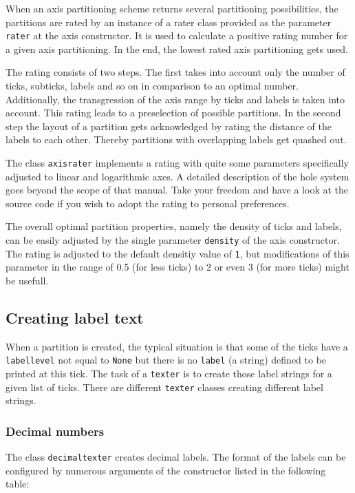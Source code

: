 When an axis partitioning scheme returns several partitioning
possibilities, the partitions are rated by an instance of a rater
class provided as the parameter \verb|rater| at the axis constructor.
It is used to calculate a positive rating number for a given axis
partitioning. In the end, the lowest rated axis partitioning gets
used.

The rating consists of two steps. The first takes into account only
the number of ticks, subticks, labels and so on in comparison to an
optimal number. Additionally, the transgression of the axis range by
ticks and labels is taken into account. This rating leads to a
preselection of possible partitions. In the second step the layout of
a partition gets acknowledged by rating the distance of the labels to
each other. Thereby partitions with overlapping labels get quashed
out.

The class \verb|axisrater| implements a rating with quite some
parameters specifically adjusted to linear and logarithmic axes. A
detailed description of the hole system goes beyond the scope of that
manual. Take your freedom and have a look at the \PyX{} source code if
you wish to adopt the rating to personal preferences.

The overall optimal partition properties, namely the density of ticks
and labels, can be easily adjusted by the single parameter
\verb|density| of the axis constructor. The rating is
adjusted to the default densitiy value of \verb|1|, but modifications
of this parameter in the range of 0.5 (for less ticks) to 2 or even 3
(for more ticks) might be usefull.

\subsection{Creating label text}

When a partition is created, the typical situation is that some of the
ticks have a \verb|labellevel| not equal to \verb|None| but there is
no \verb|label| (a string) defined to be printed at this tick. The
task of a \verb|texter| is to create those label strings for a given
list of ticks. There are different \verb|texter| classes creating
different label strings.

\subsubsection{Decimal numbers}

The class \verb|decimaltexter| creates decimal labels. The format of
the labels can be configured by numerous arguments of the constructor
listed in the following table:

